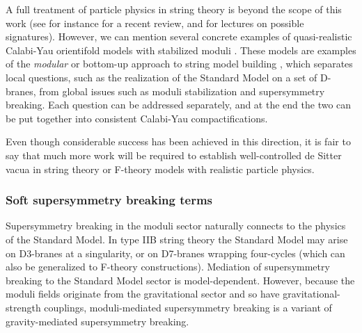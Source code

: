 \documentclass[12pt,a4wide]{article}
\begin{document}
A full treatment of particle physics in string theory is beyond the scope of this work (see for instance \cite{Marchesano:2022qbx} for a recent review, and \cite{Halverson:2018vbo} for lectures on possible signatures).   However, we can mention several concrete examples of quasi-realistic Calabi-Yau orientifold models with stabilized moduli \cite{Cicoli:2011qg,Cicoli:2012vw,Cicoli:2013cha,Cicoli:2017shd,Cicoli:2021dhg}.  These models are examples of the {\it modular} or bottom-up approach to string model building \cite{Aldazabal:2000sa,Conlon:2008wa,Donagi:2008ca, Beasley:2008dc},
which separates local questions, such as the realization of the Standard Model on a set of D-branes, from global issues such as moduli stabilization and supersymmetry breaking. 
Each question can be addressed separately, and at the end the two can be put together into consistent Calabi-Yau compactifications. 

Even though considerable success has been achieved in this direction, it is fair to say that much more work will be required to establish
well-controlled 
de Sitter vacua 
in string theory or F-theory models with 
realistic particle physics.

\subsubsection{Soft supersymmetry breaking terms}
Supersymmetry breaking in the moduli sector naturally connects to the physics of the Standard Model. In type IIB string theory the Standard Model may arise on D3-branes at a singularity, or on D7-branes wrapping four-cycles (which can also  be generalized to F-theory constructions). Mediation of supersymmetry breaking 
to
the Standard Model sector is model-dependent.  However, because the moduli fields originate from the gravitational sector and so have gravitational-strength couplings, moduli-mediated supersymmetry breaking is a variant of 
gravity-mediated supersymmetry breaking.
\end{document}
